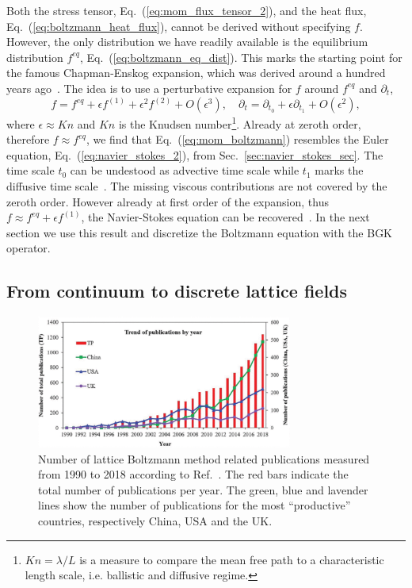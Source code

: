 Both the stress tensor, Eq.~(\ref{eq:mom_flux_tensor_2}), and the heat flux, Eq.~(\ref{eq:boltzmann_heat_flux}), cannot be derived without specifying $f$.
However, the only distribution we have readily available is the equilibrium distribution $f^{eq}$, Eq.~(\ref{eq:boltzmann_eq_dist}).
This marks the starting point for the famous Chapman-Enskog expansion, which was derived around a hundred years ago~\cite{chapmanMathematicalTheoryNonuniform1990, enskogKinetischeTheorieVorgange1917}. 
The idea is to use a perturbative expansion for $f$ around $f^{eq}$ and $\partial_t$, 
\begin{equation}\label{eq:chap-ens-expansion}
    f = f^{eq} + \epsilon f^{(1)} + \epsilon^2 f^{(2)} + O(\epsilon^3),\quad \partial_t = \partial_{t_0} + \epsilon\partial_{t_1} + O(\epsilon^2),
\end{equation}
where $\epsilon\approx Kn$ and $Kn$ is the Knudsen number\footnote{$Kn = \lambda/L$ is a measure to compare the mean free path to a characteristic length scale, i.e. ballistic and diffusive regime.}. 
Already at zeroth order, therefore $f \approx f^{eq}$, we find that Eq.~(\ref{eq:mom_boltzmann}) resembles the Euler equation, Eq.~(\ref{eq:navier_stokes_2}), from Sec.~\ref{sec:navier_stokes_sec}.
The time scale $t_0$ can be undestood as advective time scale while $t_1$ marks the diffusive time scale~\cite{dellarNonhydrodynamicModesPriori2002}.
The missing viscous contributions are not covered by the zeroth order.
However already at first order of the expansion, thus $f\approx f^{eq} + \epsilon f^{(1)}$, the Navier-Stokes equation can be recovered~\cite{chenLatticeBoltzmannMethod1998}.
In the next section we use this result and discretize the Boltzmann equation with the BGK operator.

\subsection{From continuum to discrete lattice fields} 
\begin{figure}
    \centering
    \includegraphics[width=0.75\textwidth]{graphics/lbm_citations.pdf}
    \caption{Number of lattice Boltzmann method related publications measured from 1990 to 2018 according to Ref.~\cite{liLatticeBoltzmannMethod2020}.
    The red bars indicate the total number of publications per year. 
    The green, blue and lavender lines show the number of publications for the most ``productive'' countries, respectively China, USA and the UK.}
    \label{fig:lbm_cite}
\end{figure}

